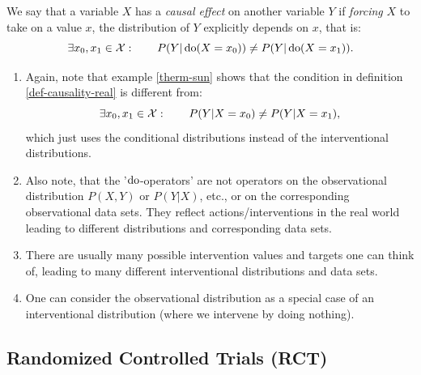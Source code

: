 \begin{Def}
    \label{def-causality-real}
    We say that a variable $X$ has a \emph{causal effect} on another variable $Y$ if
    \emph{forcing} $X$ to take on a value $x$, the distribution of $Y$ explicitly depends on $x$, that is:
    \[ \exists x_0,x_1 \in \mathcal{X}:\qquad P(Y|\operatorname{do}(X=x_0)) \neq P(Y|\operatorname{do}(X=x_1)). \]
\end{Def}

\begin{Rem}
    \begin{enumerate}
        \item 
    Again, note that example \ref{therm-sun} shows that the condition in definition \ref{def-causality-real} is different from:
    \[ \exists x_0,x_1 \in \mathcal{X}:\qquad P(Y|X=x_0) \neq P(Y|X=x_1), \]
    which just uses the conditional distributions instead of the interventional distributions.
        \item Also note, that the '$\operatorname{do}$-operators' are not operators on the observational distribution $P(X,Y)$ or $P(Y|X)$, etc., or on the corresponding observational data sets. They reflect actions/interventions in the real world leading to different distributions and corresponding data sets. 
        \item There are usually many possible intervention values and targets one can think of, leading to many different interventional distributions and data sets.
        \item One can consider the observational distribution as a special case of an interventional distribution (where we intervene by doing nothing).
    \end{enumerate}
\end{Rem}


\subsection{Randomized Controlled Trials (RCT)} %


